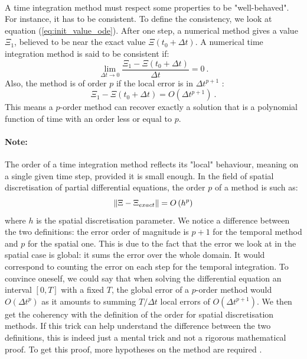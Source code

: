         \paragraph{}
        A time integration method must respect some properties to be "well-behaved".
        For instance, it has to be consistent.
        To define the consistency, we look at equation (\ref{eq:init_value_ode}).
        After one step, a numerical method gives a value $\Xi_1$, believed to be near the exact value $\Xi\left(t_0 + \Delta t\right)$.
        A numerical time integration method is said to be consistent if:
        \begin{equation}
          \lim_{\Delta t \rightarrow 0} \frac{\Xi_1 - \Xi\left(t_0 + \Delta t\right)}{\Delta t} = 0 \ .
        \end{equation}
        Also, the method is of order $p$ if the local error is in $\Delta t^{p+1}$ \cite{Iserles2008}:
        \begin{equation}
          \Xi_1 - \Xi\left(t_0 + \Delta t\right) = O\left(\Delta t^{p+1}\right) \ .
        \end{equation}
        This means a $p$-order method can recover exactly a solution that is a polynomial function of time with an order less or equal to $p$.

        \paragraph{Note:}
        The order of a time integration method reflects its "local" behaviour, meaning on a single given time step, provided it is small enough.
        In the field of spatial discretisation of partial differential equations, the order $p$ of a method is such as:
        \begin{equation}
          \norm{\Xi - \Xi_{exact}} = O\left(h^p\right)
        \end{equation}
        where $h$ is the spatial discretisation parameter.
        We notice a difference between the two definitions: the error order of magnitude is $p+1$ for the temporal method and $p$ for the spatial one.
        This is due to the fact that the error we look at in the spatial case is global: it sums the error over the whole domain.
        It would correspond to counting the error on each step for the temporal integration.
        To convince oneself, we could say that when solving the differential equation  an interval $\left[0, T\right]$ with a fixed $T$, the global error of a $p$-order method would  $O\left(\Delta t^p\right)$ as it amounts to summing $T/\Delta t$ local errors of $O\left(\Delta t^{p+1}\right)$.
        We then get the coherency with the definition of the order for spatial discretisation methods.
        If this trick can help understand the difference between the two definitions, this is indeed just a mental trick and not a rigorous mathematical proof.
        To get this proof, more hypotheses on the method are required \cite{Iserles2008}.


